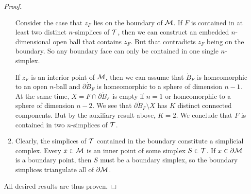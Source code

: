 \documentclass[12pt,a4paper]{article}
\newcommand{\todo}[1]{\textcolor{red}{TODO: #1}}
\begin{document}
\begin{proof}
\begin{enumerate}
    Consider the case that $z_F$ lies on the boundary of ${\mathcal M}$. 
    If $F$ is contained in at least two distinct $n$-simplices of ${\mathcal T}$,
    then we can construct an embedded $n$-dimensional open ball that contains $z_F$.
    But that contradicts $z_F$ being on the boundary. 
    So any boundary face can only be contained in one single $n$-simplex. 
    
    If $z_F$ is an interior point of ${\mathcal M}$, 
    then we can assume that $\mathring B_F$ is homeomorphic to an open $n$-ball and $\partial \mathring B_F$ is homeomorphic to a sphere of dimension $n-1$. 
    At the same time, $X = F \cap \partial \mathring B_F$ is empty if $n=1$ or homeomorphic to a sphere of dimension $n-2$. %
    We see that $\partial \mathring B_F \setminus X$ has $K$ distinct connected components. 
    But by the auxiliary result above, $K = 2$. 
    We conclude that $F$ is contained in two $n$-simplices of ${\mathcal T}$.
    
    
    \item
    Clearly, the simplices of ${\mathcal T}$ contained in the boundary constitute a simplicial complex. 
    Every $x \in {\mathcal M}$ is an inner point of some simplex $S \in {\mathcal T}$. 
    If $x \in \partial {\mathcal M}$ is a boundary point, then $S$ must be a boundary simplex, 
    so the boundary simplices triangulate all of $\partial {\mathcal M}$.
    \end{enumerate}
    All desired results are thus proven. 
\end{proof}
\end{document}
